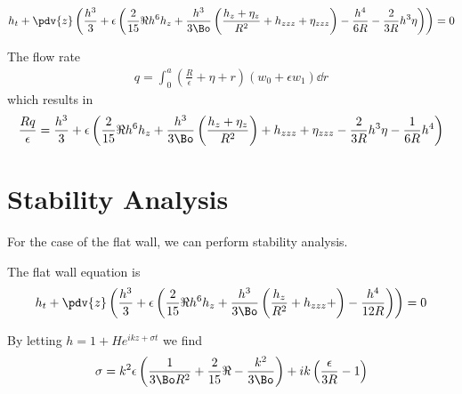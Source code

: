 \documentclass[12pt]{article}
\begin{document}
\begin{align}
h_t + \pdv{z}\left(\frac{h^3}{3} +\epsilon\left(\frac{2}{15}\Re h^6 h_z + \frac{h^3}{3\Bo}\left(\frac{h_z+ \eta_z}{R^2} + h_{zzz}+ \eta_{zzz}\right)- \frac{h^4}{6R}- \frac{2}{3R}h^3\eta\right)\right)=0
\end{align}

The flow rate 
\begin{align}
q = \int_{0}^{a}{\left(\frac{R}{\epsilon}+\eta+r\right)(w_0 + \epsilon w_1)\dd{r}}
\end{align}
which results in 
\begin{align}
\frac{Rq}{\epsilon} = \frac{h^3}{3}+\epsilon\left(\frac{2}{15}\Re h^6h_z + \frac{h^3}{3\Bo}\left(\frac{h_z+\eta_z}{R^2}\right)+h_{zzz} + \eta_{zzz}- \frac{2}{3R}h^3\eta-\frac{1}{6R}h^4\right)
\end{align}


\section{Stability Analysis}

For the case of  the flat wall, we can perform stability analysis.

The flat wall equation is 
\begin{align}
h_t + \pdv{z}\left(\frac{h^3}{3} +\epsilon\left(\frac{2}{15}\Re h^6 h_z + \frac{h^3}{3\Bo}\left(\frac{h_z}{R^2} + h_{zzz}+ \right)- \frac{h^4}{12R}\right)\right)=0
\end{align}

By letting $h = 1 + He^{ikz + \sigma t}$ we find 
\begin{align}
\sigma = k^2\epsilon\left(\frac{1}{3\Bo R^2}+\frac{2}{15}\Re  - \frac{k^2}{3\Bo}\right)+ik\left(\frac{\epsilon}{3R}-1\right)
\end{align}




\end{document}
